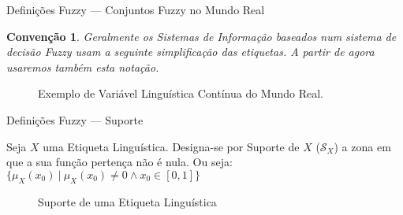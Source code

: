 \documentclass[portuges]{beamer}
\newtheorem{convention}[theorem]{Convenção}
\begin{document}
\begin{frame}{Definições Fuzzy --- Conjuntos Fuzzy no Mundo Real}
	\begin{convention}
		Geralmente os Sistemas de Informação baseados num sistema de decisão Fuzzy
		usam a seguinte simplificação das etiquetas. A partir de agora usaremos também
		esta notação.
	\end{convention}

	\begin{example}
	\begin{figure}
			\centering
			\caption{Exemplo de Variável Linguística Contínua do Mundo Real.}
	\end{figure}	
	\end{example}
\end{frame}


\begin{frame}{Definições Fuzzy --- Suporte}
\begin{definition}
		Seja $X$ uma Etiqueta Linguística. Designa-se por Suporte de $X$ ($\mathcal{S}_X$)
		a zona em que a sua função pertença não é nula. Ou seja: $\{\mu_X(x_0) \ \vert \ \mu_X(x_0) \neq 0 \land x_0 \in [0,1] \}$
	\end{definition}

	\begin{figure}
			\centering
			\caption{Suporte de uma Etiqueta Linguística}
	\end{figure}
\end{frame}
\end{document}
